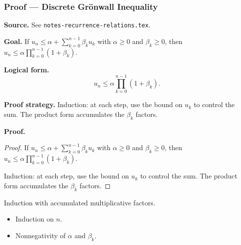 

\clearpage
{}
\hypertarget{proof-RA-ABB-T-gronwall-discrete}{}

\subsubsection[Discrete Grönwall Inequality]{Proof --- Discrete Grönwall Inequality}

\bigskip

\noindent
\textbf{Source.} See \texttt{notes-recurrence-relations.tex}.

\vspace{0.75em}

\noindent
\textbf{Goal.} If $u_n \le \alpha + \sum_{k=0}^{n-1} \beta_k u_k$ with $\alpha \ge 0$ and $\beta_k \ge 0$, then $u_n \le \alpha \prod_{k=0}^{n-1}(1 + \beta_k)$.

\vspace{0.75em}

\noindent
\textbf{Logical form.}
\[
  u_n \le \alpha \prod_{k=0}^{n-1}(1+\beta_k).
\]

\vspace{0.75em}

\noindent
\textbf{Proof strategy.} Induction: at each step, use the bound on $u_k$ to control the sum. The product form accumulates the $\beta_k$ factors.

\vspace{0.75em}

\noindent
\textbf{Proof.}
\begin{proof}
\Claim If $u_n \le \alpha + \sum_{k=0}^{n-1} \beta_k u_k$ with $\alpha \ge 0$ and $\beta_k \ge 0$, then $u_n \le \alpha \prod_{k=0}^{n-1}(1 + \beta_k)$.

\Given 

\Goal 

\Strategy Induction: at each step, use the bound on $u_k$ to control the sum. The product form accumulates the $\beta_k$ factors.

\medskip


\end{proof}

\begin{remark*}
Induction with accumulated multiplicative factors.
\end{remark*}

\begin{remark*}[Dependencies]
\begin{itemize}
  \item Induction on $n$.
  \item Nonnegativity of $\alpha$ and $\beta_k$.
\end{itemize}
\end{remark*}
